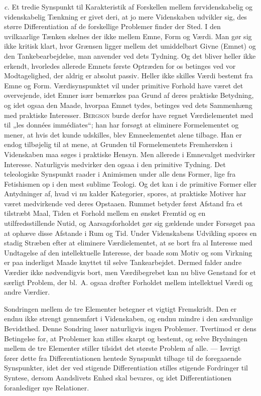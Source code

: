 \documentclass[12pt]{article}
\newcommand{\opage}[1]{\marginnote{\footnotesize\textit{[#1]}}}
\begin{document}
\textit{c.} Et tredie Synspunkt til Karakteristik af Forskellen mellem
førvidenskabelig og videnskabelig Tænkning er givet deri, at jo mere Videnskaben
udvikler sig, des større Differentiation af de forskellige Problemer finder der
Sted. I den uvilkaarlige Tænken skelnes der ikke mellem Emne, Form og Værdi. Man
gør sig ikke kritisk klart, hvor Grænsen ligger mellem det umiddelbart Givne
(Emnet) og den Tankebearbejdelse, man anvender ved dets Tydning. Og det bliver
heller ikke erkendt, hvorledes allerede Emnets første Optræden for os betinges
ved vor Modtagelighed, der aldrig er absolut passiv. Heller ikke skilles Værdi
bestemt fra Emne og Form. Værdisynspunktet vil under primitive Forhold have
været det overvejende, idet Emner især bemærkes paa Grund af deres praktiske
Betydning, og idet ogsaa den Maade, hvorpaa Emnet tydes, betinges ved dets
Sammenhæng med praktiske Interesser. \textsc{Bergson} burde derfor have regnet
Værdielementet med til „les données immédiates“; han har forsøgt at eliminere
Formelementet og mener, at hvis det kunde udskilles, blev Emneelementet alene
tilbage. Han er
\opage{13}endog tilbøjelig til at mene, at Grunden til Formelementets
Fremhersken i Videnskaben maa søges i praktiske Hensyn. Men allerede i
Emnevalget medvirker Interesse. Naturligvis medvirker den ogsaa i den primitive
Tydning. Det teleologiske Synspunkt raader i Animismen under alle dens Former,
lige fra Fetishismen op i den mest sublime Teologi. Og det kan i de primitive
Former eller Antydninger af, hvad vi nu kalder Kategorier, spores, at praktiske
Motiver har været medvirkende ved deres Opstaaen. Rummet betyder først Afstand
fra et tilstræbt Maal, Tiden et Forhold mellem en ønsket Fremtid og en
utilfredsstillende Nutid, og Aarsagsforholdet gør sig gældende under Forsøget
paa at ophæve disse Afstande i Rum og Tid. Under Videnskabens Udvikling spores
en stadig Stræben efter at eliminere Værdielementet, at se bort fra al Interesse
med Undtagelse af den intellektuelle Interesse, der baade som Motiv og som
Virkning er paa inderligst Maade knyttet til selve Tankearbejdet. Dermed falder
andre Værdier ikke nødvendigvis bort, men Værdibegrebet kan nu blive Genstand
for et særligt Problem, der bl.~A. ogsaa drøfter Forholdet mellem intellektuel
Værdi og andre Værdier.

Sondringen mellem de tre Elementer betegner et vigtigt Fremskridt. Den er endnu
ikke strengt gennemført i Videnskaben, og endnu mindre i den sædvanlige
Bevidsthed. Denne Sondring løser naturligvis ingen Problemer. Tvertimod er dens
Betingelse for, at Problemer kan stilles skarpt og bestemt, og selve Brydningen
mellem de tre Elementer stiller tilsidst det største Problem af alle. ---
Iøvrigt fører dette fra Differentiationen hentede Synspunkt tilbage til de
foregaaende Synspunkter, idet der ved stigende Differentiation stilles stigende
Fordringer til Syntese, dersom Aandslivets Enhed skal bevares, og idet
Differentiationen foranlediger nye Relationer.
\end{document}
